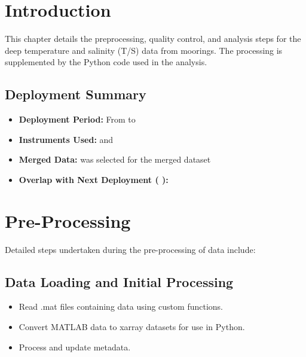 \section{Introduction}

This chapter details the preprocessing, quality control, 
and analysis steps for the deep temperature and salinity (T/S) data from \projectname{} \casenumber{} moorings.
The processing is supplemented by the Python code used in the analysis.

\subsection{Deployment Summary}
\begin{itemize}
    \item \textbf{Deployment Period:} From \DeploymentSpike{} to \RecoverySpike{}
    \item \textbf{Instruments Used:} \FirstInstrumentType{} \FirstInstrument{} and \SecondInstrumentType{} \SecondInstrument{}
    \item \textbf{Merged Data:} \CurrentDeploymentInstrument{} was selected for the merged dataset
    \item \textbf{Overlap with Next Deployment (\projectname{} \nextcasenumber{}):} \HasNextDeploymentOverlap{}
\end{itemize}

\section{Pre-Processing}
Detailed steps undertaken during the pre-processing of \projectname{} \casenumber{} data include:

\subsection{Data Loading and Initial Processing}
\begin{itemize}
\item Read .mat files containing \FirstInstrumentType{} data using custom functions.
\item Convert MATLAB data to xarray datasets for use in Python.
\item Process and update metadata.
\end{itemize}

